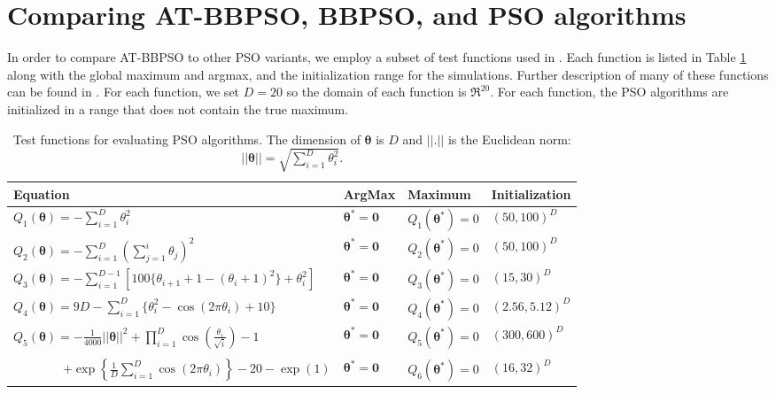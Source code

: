 \documentclass[12pt]{article}
\begin{document}
\section{Comparing AT-BBPSO, BBPSO, and PSO algorithms}\label{app:psocompare}
In order to compare AT-BBPSO to other PSO variants, we employ a subset of test functions used in \citet{hsieh2010modified}. Each function is listed in Table \ref{tab:testfuns} along with the global maximum and argmax, and the initialization range for the simulations. Further description of many of these functions can be found in \citet{clerc2010particle}. For each function, we set $D=20$ so the domain of each function is $\Re^{20}$. For each function, the PSO algorithms are initialized in a range that does not contain the true maximum.

\begin{table}[h]
\centering
\begin{tabular}{llll}
 Equation & ArgMax & Maximum & Initialization \\\hline
 $Q_1(\bm{\theta}) = -\sum_{i=1}^D\theta_i^2$ & $\bm{\theta}^* = \bm{0}$ & $Q_1(\bm{\theta}^*) = 0$  & $(50, 100)^D$ \\
 $Q_2(\bm{\theta}) = -\sum_{i=1}^D\left(\sum_{j=1}^i \theta_j\right)^2 $ & $\bm{\theta}^* = \bm{0}$ & $Q_2(\bm{\theta}^*) = 0$ & $(50, 100)^D$ \\
 $Q_3(\bm{\theta}) = -\sum_{i=1}^{D-1}\left[100\{\theta_{i+1} + 1 - (\theta_i + 1)^2\} + \theta_i^2\right]$ & $\bm{\theta}^* = \bm{0}$ & $Q_3(\bm{\theta}^*) = 0$ & $(15, 30)^D$ \\
 $Q_4(\bm{\theta}) = 9D - \sum_{i=1}^D\{\theta_i^2 - \cos(2\pi \theta_i) + 10\}$ & $\bm{\theta}^*=\bm{0}$ & $Q_4(\bm{\theta}^*) = 0$ & $(2.56, 5.12)^D$ \\
 $Q_5(\bm{\theta}) = -\frac{1}{4000}||\bm{\theta}||^2 + \prod_{i=1}^D\cos\left(\frac{\theta_i}{\sqrt{i}}\right) - 1$ & $\bm{\theta}^* = \bm{0}$ & $Q_5(\bm{\theta}^*) = 0$ & $(300, 600)^D$ \\
 \shortstack[l]{$Q_6(\bm{\theta}) = 20\exp\left(-0.2\sqrt{\frac{1}{D}||\bm{\theta}||}\right)$ \\ \ \ \ \ \ \ \ \ $+ \exp\left\{\frac{1}{D}\sum_{i=1}^D\cos(2\pi \theta_i)\right\} - 20 - \exp(1)$} & $\bm{\theta}^* = \bm{0}$ & $Q_6(\bm{\theta}^*) = 0$ & $(16, 32)^D$\\\hline
\end{tabular}
\caption{Test functions for evaluating PSO algorithms. The dimension of $\bm{\theta}$ is $D$ and $||.||$ is the Euclidean norm: $||\bm{\theta}|| = \sqrt{\sum_{i=1}^D\theta_i^2}$.} 
\label{tab:testfuns}
\end{table}
\end{document}
